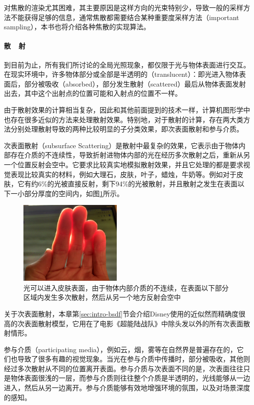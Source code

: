 对焦散的渲染尤其困难，其主要原因是这样方向的光束特别少，导致一般的采样方法不能获得足够的信息，通常焦散都需要结合某种重要度采样方法（important sampling），本书也将介绍各种焦散的实现算法。



\paragraph{散~~射}
到目前为止，所有我们所讨论的全局光照现象，都仅限于光与物体表面进行交互。在现实环境中，许多物体部分或全部是半透明的（translucent）：即光进入物体表面后，部分被吸收（absorbed），部分发生散射（scattered）最后从物体表面发射出去，其中这个出射点的位置可能和入射点的位置不一样。

由于散射效果的计算相当复杂，因此和其他前面提到的技术一样，计算机图形学中也存在很多近似的方法来处理散射效果。特别地，对于散射的计算，存在两大类方法分别处理散射导致的两种比较明显的子分类效果，即次表面散射和参与介质。

次表面散射（subsurface Scattering）是散射中最复杂的效果，它表示由于物体内部存在介质的不连续性，导致折射进物体内部的光在经历多次散射之后，重新从另一个位置反射会空中。它要求比较真实地模拟散射效果，并且它处理的都是要求视觉表现比较真实的材料，例如大理石，皮肤，叶子，蜡烛，牛奶等。例如对于皮肤，它有约6\%的光被直接反射，剩下94\%的光被散射，并且散射之发生在表面以下一小部分厚度的空间内，如图\ref{f:intro-sss}所示。

\begin{figure}
\sidecaption
\includegraphics[width=0.45\textwidth]{figures/intro/subsurface-scattering}	
\caption{光可以进入皮肤表面，由于物体内部介质的不连续，在表面以下部分区域内发生多次散射，然后从另一个地方反射会空中}
\label{f:intro-sss}
\end{figure}

关于次表面散射，本章第\ref{sec:intro-bsdf}节会介绍Disney使用的近似然而精确度很高的次表面散射模型，它用在了电影《超能陆战队》中除头发以外的所有次表面散射情形。

参与介质（participating media），例如云，烟，雾等在自然界是普遍存在的，它们也导致了很多有趣的视觉现象。当光在参与介质中传播时，部分被吸收，其他则经过多次散射从不同的位置离开表面。参与介质与次表面不同的是，次表面往往只是物体表面很浅的一层，而参与介质则往往整个介质是半透明的，光线能够从一边进入，然后从另一边离开。参与介质能够有效地增强环境的氛围，以及对场景深度的感知。

